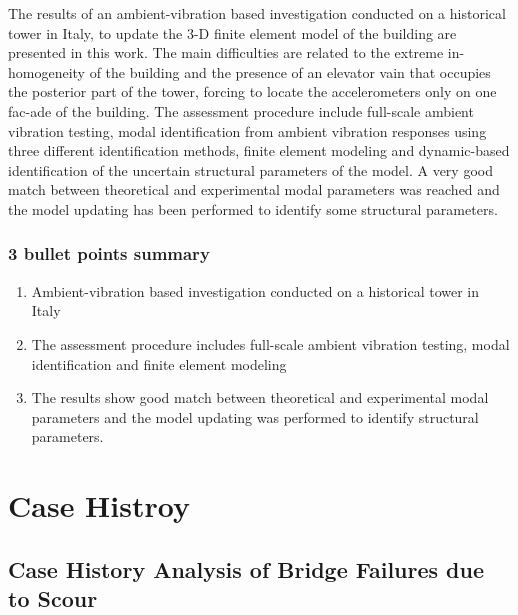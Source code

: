 \documentclass[
  letterpaper,
  DIV=11,
  numbers=noendperiod]{scrreprt}
\providecommand{\tightlist}{%
  \setlength{\itemsep}{0pt}\setlength{\parskip}{0pt}}\usepackage{longtable,booktabs,array}
\begin{document}
The results of an ambient-vibration based investigation conducted on a
historical tower in Italy, to update the 3-D finite element model of the
building are presented in this work. The main difficulties are related
to the extreme in-homogeneity of the building and the presence of an
elevator vain that occupies the posterior part of the tower, forcing to
locate the accelerometers only on one fac-ade of the building. The
assessment procedure include full-scale ambient vibration testing, modal
identification from ambient vibration responses using three different
identification methods, finite element modeling and dynamic-based
identification of the uncertain structural parameters of the model. A
very good match between theoretical and experimental modal parameters
was reached and the model updating has been performed to identify some
structural parameters.

\hypertarget{bullet-points-summary-19}{%
\subsubsection{3 bullet points summary}\label{bullet-points-summary-19}}

\begin{enumerate}
\def\labelenumi{\arabic{enumi}.}
\tightlist
\item
  Ambient-vibration based investigation conducted on a historical tower
  in Italy
\item
  The assessment procedure includes full-scale ambient vibration
  testing, modal identification and finite element modeling
\item
  The results show good match between theoretical and experimental modal
  parameters and the model updating was performed to identify structural
  parameters.
\end{enumerate}

\hypertarget{case-histroy}{%
\section{Case Histroy}\label{case-histroy}}

\hypertarget{case-history-analysis-of-bridge-failures-due-to-scour}{%
\subsection{Case History Analysis of Bridge Failures due to
Scour}\label{case-history-analysis-of-bridge-failures-due-to-scour}}
\end{document}
